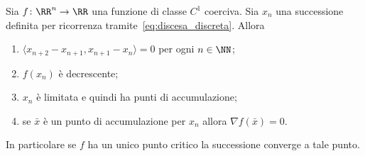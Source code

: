 \begin{theorem}
Sia $f\colon \RR^n\to \RR$ una funzione di classe $C^1$
coerciva. 
Sia $x_n$ una successione definita per ricorrenza 
tramite~\eqref{eq:discesa_discreta}. Allora
\begin{enumerate}
  \item $\langle x_{n+2}-x_{n+1}, x_{n+1}-x_n\rangle =0$ per ogni $n\in\NN$;
  \item $f(x_n)$ è decrescente;
  \item $x_n$ è limitata e quindi ha punti di accumulazione;
  \item se $\bar x$ è un punto di accumulazione 
  per $x_n$ allora $\nabla f(\bar x)=0$.
\end{enumerate}

In particolare se $f$ ha un unico punto critico 
la successione converge a tale punto.
\end{theorem}
%
